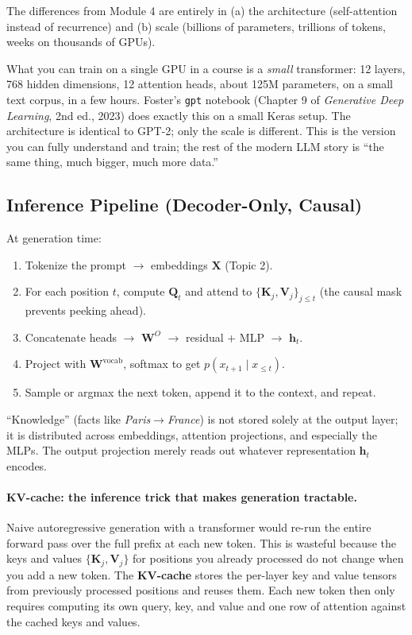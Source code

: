 \documentclass[11pt]{article}
\theoremstyle{remark}
\begin{document}
The differences from Module 4 are entirely in (a) the architecture (self-attention instead of recurrence) and (b) scale (billions of parameters, trillions of tokens, weeks on thousands of GPUs).

What you can train on a single GPU in a course is a \emph{small} transformer: 12 layers, 768 hidden dimensions, 12 attention heads, about 125M parameters, on a small text corpus, in a few hours. Foster's \texttt{gpt} notebook (Chapter 9 of \emph{Generative Deep Learning}, 2nd ed., 2023) does exactly this on a small Keras setup. The architecture is identical to GPT-2; only the scale is different. This is the version you can fully understand and train; the rest of the modern LLM story is ``the same thing, much bigger, much more data.''

\subsection{Inference Pipeline (Decoder-Only, Causal)}

At generation time:
\begin{enumerate}[noitemsep]
  \item Tokenize the prompt \(\to\) embeddings \(\mathbf{X}\) (Topic 2).
  \item For each position \(t\), compute \(\mathbf{Q}_t\) and attend to \(\{\mathbf{K}_j,\mathbf{V}_j\}_{j\le t}\) (the causal mask prevents peeking ahead).
  \item Concatenate heads \(\to\) \(\mathbf{W}^O\) \(\to\) residual + MLP \(\to\) \(\mathbf{h}_t\).
  \item Project with \(\mathbf{W}^{\text{vocab}}\), softmax to get \(p(x_{t+1}\mid x_{\le t})\).
  \item Sample or argmax the next token, append it to the context, and repeat.
\end{enumerate}
``Knowledge'' (facts like \emph{Paris\(\to\)France}) is not stored solely at the output layer; it is distributed across embeddings, attention projections, and especially the MLPs. The output projection merely reads out whatever representation \(\mathbf{h}_t\) encodes.

\paragraph{KV-cache: the inference trick that makes generation tractable.}
Naive autoregressive generation with a transformer would re-run the entire forward pass over the full prefix at each new token. This is wasteful because the keys and values \(\{\mathbf{K}_j,\mathbf{V}_j\}\) for positions you already processed do not change when you add a new token. The \textbf{KV-cache} stores the per-layer key and value tensors from previously processed positions and reuses them. Each new token then only requires computing its own query, key, and value and one row of attention against the cached keys and values.
\end{document}
